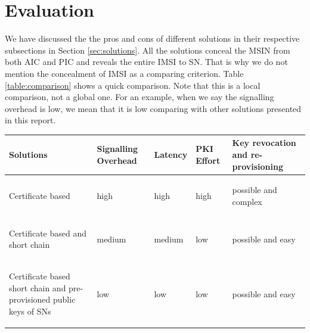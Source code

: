 \documentclass[runningheads,a4paper]{llncs} %
\begin{document}
\section{Evaluation}
\label{sec:evaluation}
We have discussed the the pros and cons of different solutions in their respective subsections in Section \ref{sec:solutions}. All the solutions conceal the MSIN from both AIC and PIC and reveals the entire IMSI to SN. That is why we do not mention the concealment of IMSI as a comparing criterion.  Table \ref{table:comparison} shows a quick comparison. Note that this is a local comparison, not a global one. For an example, when we say the signalling overhead is low, we mean that it is low comparing with other solutions presented in this report. 
\begin{table}
\begin{center}
\begin{tabular}{ |p{3.5cm}|p{2cm}|p{2cm}|p{2cm}|p{2cm}|  }
\hline
\textbf{Solutions} & \textbf{Signalling Overhead} & \textbf{Latency} & \textbf{PKI Effort} & \textbf{Key revocation and re-provisioning}\\
\hline \hline
\begin{center} Certificate based \end{center} & \begin{center} high \end{center} & \begin{center} high \end{center} & \begin{center} high \end{center} & \begin{center} possible and complex \end{center}\\ \hline
\begin{center} Certificate based and short chain \end{center} & \begin{center} medium \end{center} & \begin{center} medium \end{center} &  \begin{center} low \end{center} & \begin{center} possible and easy \end{center} \\ \hline
\begin{center} Certificate based short chain and pre-provisioned public keys of SNs \end{center} & \begin{center} low \end{center} & \begin{center} low \end{center} & \begin{center} low \end{center} & \begin{center} possible and easy \end{center} \\ \hline

\end{tabular}
\end{center}
\end{table}
\end{document}
